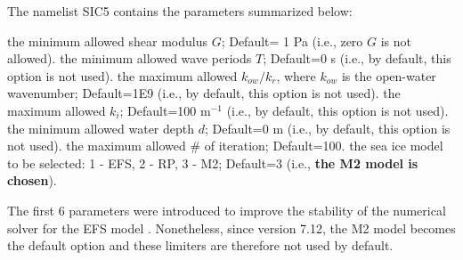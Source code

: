 The namelist {\F SIC5} contains the parameters summarized below:
\begin{clist}
 {the minimum allowed shear modulus $G$; Default= 1 Pa (i.e., zero $G$ is not allowed).}
%
 {the minimum allowed wave periods $T$; Default=0 s (i.e., by default, this option is not used).}
%
 {the maximum allowed $k_{ow}/k_r$, where $k_{ow}$ is the open-water wavenumber; Default=1E9 (i.e., by default, this option is not used).}
%
 {the maximum allowed $k_i$; Default=100 m$^{-1}$ (i.e., by default, this option is not used).}
%
 {the minimum allowed water depth $d$; Default=0 m (i.e., by default, this option is not used).}
%
 {the maximum allowed \# of iteration; Default=100.}
%
 {the sea ice model to be selected: 1 - {\code EFS}, 2 - {\code RP}, 3 - {\code M2}; Default=3 (i.e., \textbf{the {\code M2} model is chosen}).}
\end{clist}
The first 6 parameters were introduced to improve the stability of the numerical solver for the EFS model \citep[the solver may fail for small wave periods in some rare cases, particularly for shallow water depth $d$ and low $G$; see][]{Liu2020}. Nonetheless, since version 7.12, the M2 model becomes the default option and these limiters are therefore not used by default.